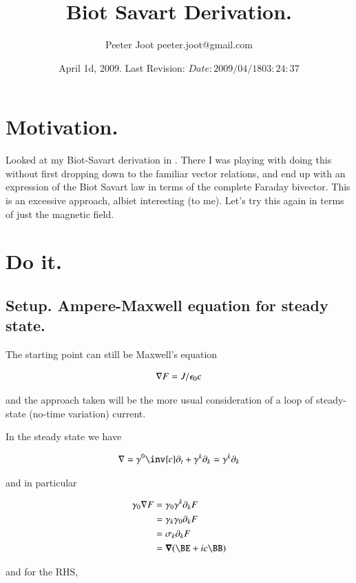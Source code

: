 \documentclass{article}
\title{ Biot Savart Derivation. }
\author{Peeter Joot \quad peeter.joot@gmail.com }
\date{ April 1d, 2009.  Last Revision: $Date: 2009/04/18 03:24:37 $ }
\begin{document}
\maketitle{}
\tableofcontents
\section{ Motivation. }

Looked at my Biot-Savart derivation in \cite{PJelectricFieldEnergy}.  There I was playing with doing this without first dropping down to the
familiar vector relations, and end up with an expression of the Biot Savart law in terms of the complete Faraday bivector.  This is
an excessive approach, albiet interesting (to me).  Let's try this again in terms of just the magnetic field.

\section{ Do it. }

\subsection{ Setup. Ampere-Maxwell equation for steady state. }

The starting point can still be Maxwell's equation

\begin{align}
\nabla F = J/\epsilon_0 c
\end{align}

and the approach taken will be the more usual consideration of a loop of steady-state (no-time variation) current.

In the steady state we have

\begin{align*}
\grad = \gamma^0 \inv{c} \partial_t + \gamma^k \partial_k = \gamma^k \partial_k
\end{align*}

and in particular 

\begin{align*}
\gamma_0 \grad F 
&= \gamma_0 \gamma^k \partial_k F \\
&= \gamma_k \gamma_0 \partial_k F \\
&= \sigma_k \partial_k F \\
&= \spacegrad (\BE + i c \BB) \\
\end{align*}

and for the RHS,
\end{document}
